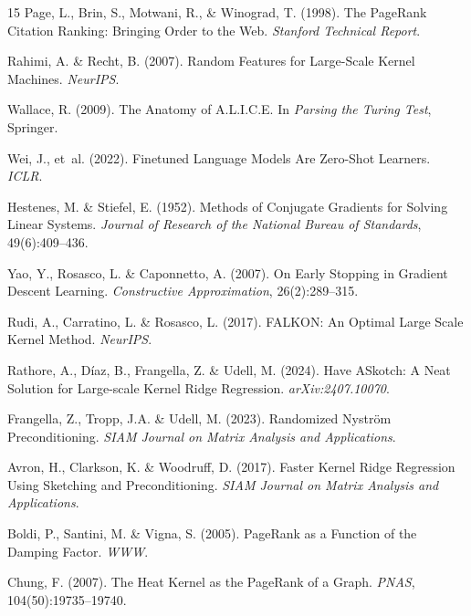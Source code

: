 \documentclass[11pt,a4paper]{article}
\begin{document}
\begin{thebibliography}{15}
Page, L., Brin, S., Motwani, R., \& Winograd, T. (1998).
\newblock The PageRank Citation Ranking: Bringing Order to the Web.
\newblock \emph{Stanford Technical Report}.

Rahimi, A. \& Recht, B. (2007).
\newblock Random Features for Large-Scale Kernel Machines.
\newblock \emph{NeurIPS}.

Wallace, R. (2009).
\newblock The Anatomy of A.L.I.C.E.
\newblock In \emph{Parsing the Turing Test}, Springer.

Wei, J., et~al. (2022).
\newblock Finetuned Language Models Are Zero-Shot Learners.
\newblock \emph{ICLR}.

Hestenes, M. \& Stiefel, E. (1952).
\newblock Methods of Conjugate Gradients for Solving Linear Systems.
\newblock \emph{Journal of Research of the National Bureau of Standards}, 49(6):409--436.

Yao, Y., Rosasco, L. \& Caponnetto, A. (2007).
\newblock On Early Stopping in Gradient Descent Learning.
\newblock \emph{Constructive Approximation}, 26(2):289--315.

Rudi, A., Carratino, L. \& Rosasco, L. (2017).
\newblock FALKON: An Optimal Large Scale Kernel Method.
\newblock \emph{NeurIPS}.

Rathore, A., D\'iaz, B., Frangella, Z. \& Udell, M. (2024).
\newblock Have ASkotch: A Neat Solution for Large-scale Kernel Ridge Regression.
\newblock \emph{arXiv:2407.10070}.

Frangella, Z., Tropp, J.A. \& Udell, M. (2023).
\newblock Randomized Nystr\"om Preconditioning.
\newblock \emph{SIAM Journal on Matrix Analysis and Applications}.

Avron, H., Clarkson, K. \& Woodruff, D. (2017).
\newblock Faster Kernel Ridge Regression Using Sketching and Preconditioning.
\newblock \emph{SIAM Journal on Matrix Analysis and Applications}.

Boldi, P., Santini, M. \& Vigna, S. (2005).
\newblock PageRank as a Function of the Damping Factor.
\newblock \emph{WWW}.

Chung, F. (2007).
\newblock The Heat Kernel as the PageRank of a Graph.
\newblock \emph{PNAS}, 104(50):19735--19740.

\end{thebibliography}
\end{document}
